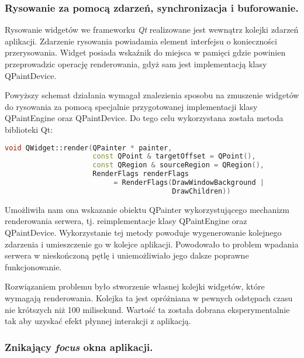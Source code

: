 \subsubsection{Rysowanie za pomocą zdarzeń, synchronizacja i buforowanie.}
\label{rendering_events}

Rysowanie widgetów we frameworku \emph{Qt} realizowane jest wewnątrz kolejki zdarzeń aplikacji. Zdarzenie rysowania powiadamia element interfejsu o konieczności przerysowania. Widget posiada wskaźnik do miejsca w pamięci gdzie powinien przeprowadzic operację renderowania, gdyż sam jest implementacją klasy QPaintDevice. 

Powyższy schemat działania wymagał znalezienia sposobu na zmuszenie widgetów do rysowania za pomocą specjalnie przygotowanej implementacji klasy QPaintEngine oraz QPaintDevice. Do tego celu wykorzystana została metoda biblioteki Qt:

\begin{lstlisting}[language=C++,numbers=none]
void QWidget::render(QPainter * painter, 
                     const QPoint & targetOffset = QPoint(), 
                     const QRegion & sourceRegion = QRegion(), 
                     RenderFlags renderFlags 
                          = RenderFlags(DrawWindowBackground | 
                                        DrawChildren))
\end{lstlisting}

Umożliwiła nam ona wskazanie obiektu QPainter wykorzystującego mechanizm renderowania serwera, tj. reimplementacje klasy QPaintEngine oraz QPaintDevice. Wykorzystanie tej metody powoduje wygenerowanie kolejnego zdarzenia i umieszczenie go w kolejce aplikacji. Powodowało to problem wpadania serwera w nieskończoną pętlę i uniemożliwiało jego dalsze poprawne funkcjonowanie. 

Rozwiązaniem problemu było stworzenie własnej kolejki widgetów, które wymagają renderowania. Kolejka ta jest opróżniana w pewnych odstępach czasu nie krótszych niż 100 milisekund. Wartość ta została dobrana eksperymentalnie tak aby uzyskać efekt płynnej interakcji z aplikacją.

\subsubsection{Znikający \emph{focus} okna aplikacji.}
\label{problems_focus}

